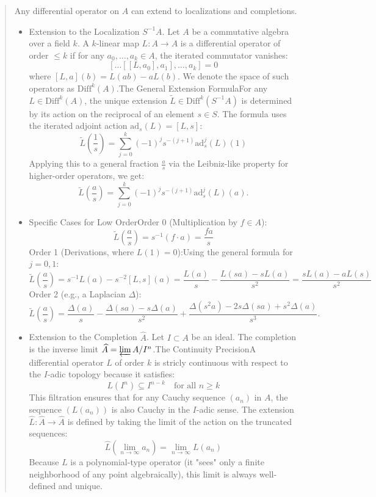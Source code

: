 \documentclass[12pt]{amsart}
\numberwithin{equation}{section}
\newcommand{\aiblock}[1]{
  \begin{quote} 
  {\color{CadetBlue}\sffamily\small #1}
  \end{quote}
}
\begin{document}
\aiblock{
  Any differential operator on $A$ can extend to localizations and completions.
  \begin{itemize}
    \item Extension to the Localization $S^{-1}A$. Let $A$ be a commutative algebra over a field $k$. A $k$-linear map $L: A \to A$ is a differential operator of order $\le k$ if for any $a_0, \dots, a_k \in A$, the iterated commutator vanishes:$$[\dots[[L, a_0], a_1], \dots, a_k] = 0$$where $[L, a](b) = L(ab) - aL(b)$. We denote the space of such operators as $\text{Diff}^k(A)$.The General Extension FormulaFor any $L \in \text{Diff}^k(A)$, the unique extension $\widetilde{L} \in \text{Diff}^k(S^{-1}A)$ is determined by its action on the reciprocal of an element $s \in S$. The formula uses the iterated adjoint action $\text{ad}_s(L) = [L, s]$:$$\widetilde{L}\left(\frac{1}{s}\right) = \sum_{j=0}^{k} (-1)^j s^{-(j+1)} \text{ad}_s^j(L)(1)$$Applying this to a general fraction $\frac{a}{s}$ via the Leibniz-like property for higher-order operators, we get:$$\widetilde{L}\left(\frac{a}{s}\right) = \sum_{j=0}^{k} (-1)^j s^{-(j+1)} \text{ad}_s^j(L)(a).$$
    \item Specific Cases for Low OrderOrder 0 (Multiplication by $f \in A$):$$\widetilde{L}\left(\frac{a}{s}\right) = s^{-1}(f \cdot a) = \frac{fa}{s}$$Order 1 (Derivations, where $L(1)=0$):Using the general formula for $j=0, 1$:$$\widetilde{L}\left(\frac{a}{s}\right) = s^{-1}L(a) - s^{-2}[L, s](a) = \frac{L(a)}{s} - \frac{L(sa) - sL(a)}{s^2} = \frac{sL(a) - aL(s)}{s^2}$$Order 2 (e.g., a Laplacian $\Delta$):$$\widetilde{L}\left(\frac{a}{s}\right) = \frac{\Delta(a)}{s} - \frac{\Delta(sa)-s\Delta(a)}{s^2} + \frac{\Delta(s^2 a) - 2s\Delta(sa) + s^2\Delta(a)}{s^3}.$$
    \item Extension to the Completion $\widehat{A}$. Let $I \subset A$ be an ideal. The completion is the inverse limit $\widehat{A} = \varprojlim A/I^n$.The Continuity PrecisionA differential operator $L$ of order $k$ is stricly continuous with respect to the $I$-adic topology because it satisfies:$$L(I^n) \subseteq I^{n-k} \quad \text{for all } n \ge k$$This filtration ensures that for any Cauchy sequence $(a_n)$ in $A$, the sequence $(L(a_n))$ is also Cauchy in the $I$-adic sense. The extension $\widehat{L}: \widehat{A} \to \widehat{A}$ is defined by taking the limit of the action on the truncated sequences:$$\widehat{L}\left( \lim_{n \to \infty} a_n \right) = \lim_{n \to \infty} L(a_n)$$Because $L$ is a polynomial-type operator (it "sees" only a finite neighborhood of any point algebraically), this limit is always well-defined and unique.

\end{itemize}}
\end{document}
